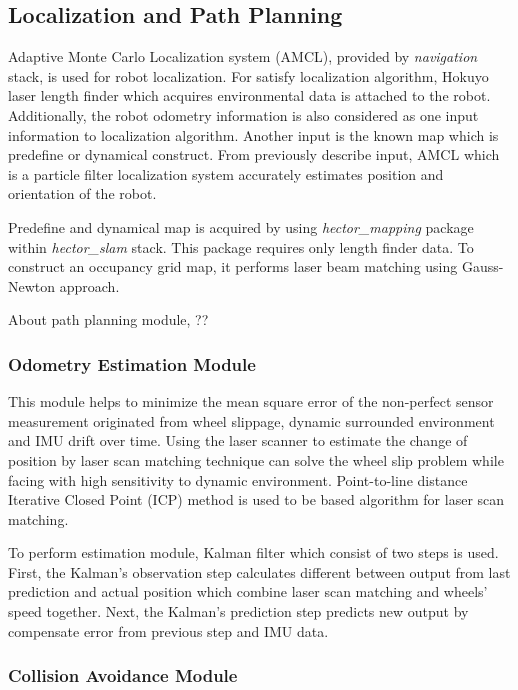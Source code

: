 \documentclass{llncs}
\begin{document}
\subsection{Localization and Path Planning}

Adaptive Monte Carlo Localization system (AMCL), provided by \textit{navigation} stack, is used for robot localization. For satisfy localization algorithm, Hokuyo laser length finder which acquires environmental data is attached to the robot. Additionally, the robot odometry information is also considered as one input information to localization algorithm. Another input is the known map which is predefine or dynamical construct. From previously describe input, AMCL which is a particle filter localization system accurately estimates position and orientation of the robot.

Predefine and dynamical map is acquired by using \textit{hector\_mapping} package within \textit{hector\_slam} stack. This package requires only length finder data. To construct an occupancy grid map, it performs laser beam matching using Gauss-Newton approach\cite{hector_slam}.

About path planning module, ??

\subsubsection{Odometry Estimation Module}

This module helps to minimize the mean square error of the non-perfect sensor measurement originated from wheel slippage, dynamic surrounded environment and IMU drift over time. Using the laser scanner to estimate the change of position by laser scan matching technique can solve the wheel slip problem while facing with high sensitivity to dynamic environment. Point-to-line distance Iterative Closed Point (ICP)\cite{icp1}\cite{icp2} method is used to be based algorithm for laser scan matching.

To perform estimation module, Kalman filter which consist of two steps is used. First, the Kalman's observation step calculates different between output from last prediction and actual position which combine laser scan matching and wheels' speed together. Next, the Kalman's prediction step predicts new output by compensate error from previous step and IMU data.

\subsubsection{Collision Avoidance Module}
\end{document}
